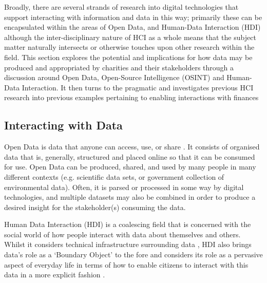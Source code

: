 
Broadly, there are several strands of research into digital technologies that support interacting with information and data in this way; primarily these can be encapsulated within the areas of Open Data, and Human-Data Interaction (HDI) although the inter-disciplinary nature of HCI as a whole means that the subject matter naturally intersects or otherwise touches upon other research within the field. This section explores the potential and implications for how data may be produced and appropriated by charities and their stakeholders through a discussion around Open Data, Open-Source Intelligence (OSINT) and Human-Data Interaction. It then turns to the pragmatic and investigates previous HCI research into previous examples pertaining to enabling interactions with finances

\subsection{Interacting with Data}
Open Data is data that anyone can access, use, or share \cite{open_data_institute_what_nodate}. It consists of organised data that is, generally, structured and placed online so that it can be consumed for use. Open Data can be produced, shared, and used by many people in many different contexts (e.g. scientific data sets, or government collection of environmental data). Often, it is parsed or processed in some way by digital technologies, and multiple datasets may also be combined in order to produce a desired insight for the stakeholder(s) consuming the data.

Human Data Interaction (HDI) is a coalescing field that is concerned with the social world of how people interact with data about themselves and others. Whilst it considers technical infrastructure surrounding data \cite{mcauley_dataware_2011}, HDI also brings data's role as a `Boundary Object' \cite{star_institutional_1989} to the fore and considers its role as a pervasive aspect of everyday life in terms of how to enable citizens to interact with this data in a more explicit fashion \cite{mortier_human-data_2014}.


